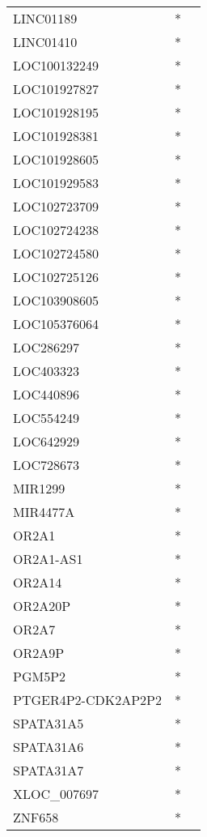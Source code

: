 \begin{tabular}{lcc}
LINC01189          &  * &         \\
LINC01410          &  * &         \\
LOC100132249       &  * &         \\
LOC101927827       &  * &         \\
LOC101928195       &  * &         \\
LOC101928381       &  * &         \\
LOC101928605       &  * &         \\
LOC101929583       &  * &         \\
LOC102723709       &  * &         \\
LOC102724238       &  * &         \\
LOC102724580       &  * &         \\
LOC102725126       &  * &         \\
LOC103908605       &  * &         \\
LOC105376064       &  * &         \\
LOC286297          &  * &         \\
LOC403323          &  * &         \\
LOC440896          &  * &         \\
LOC554249          &  * &         \\
LOC642929          &  * &         \\
LOC728673          &  * &         \\
MIR1299            &  * &         \\
MIR4477A           &  * &         \\
OR2A1              &  * &         \\
OR2A1-AS1          &  * &         \\
OR2A14             &  * &         \\
OR2A20P            &  * &         \\
OR2A7              &  * &         \\
OR2A9P             &  * &         \\
PGM5P2             &  * &         \\
PTGER4P2-CDK2AP2P2 &  * &         \\
SPATA31A5          &  * &         \\
SPATA31A6          &  * &         \\
SPATA31A7          &  * &         \\
XLOC\_007697        &  * &         \\
ZNF658             &  * &         \\
\bottomrule
\end{tabular}
